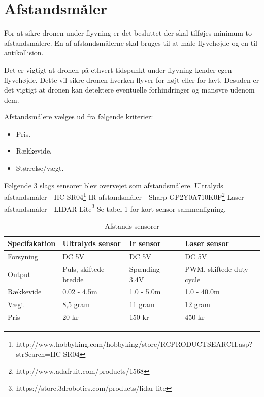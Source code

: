 \section{Afstandsmåler}

For at sikre dronen under flyvning er det besluttet der skal tilføjes minimum to afstandsmålere. En af afstandsmålerne skal bruges til at måle flyvehøjde og en til antikollision.

Det er vigtigt at dronen på ethvert tidspunkt under flyvning kender egen flyvehøjde. Dette vil sikre dronen hverken flyver for højt eller for lavt. Desuden er det vigtigt at dronen kan detektere eventuelle forhindringer og manøvre udenom dem.

Afstandsmålere vælges ud fra følgende kriterier:  
\begin{itemize}
	\item Pris.
	\item Rækkevide. 
	\item Størrelse/vægt. 
\end{itemize}

\vspace{0.5cm}

Følgende 3 slags sensorer blev overvejet som afstandsmålere. 
\newline Ultralyds afstandsmåler - HC-SR04\footnote{http://www.hobbyking.com/hobbyking/store/RC\textunderscore PRODUCT\textunderscore SEARCH.asp?strSearch=HC-SR04}  
\newline IR afstandsmåler - Sharp GP2Y0A710K0F\footnote{http://www.adafruit.com/products/1568}  \newline Laser afstandsmåler - LIDAR-Lite\footnote{https://store.3drobotics.com/products/lidar-lite}  \newline Se tabel \ref{tab:Afstands_sensorer} for kort sensor sammenligning.

\begin{table}[H]
	\centering
		\begin{tabular}{|p{2.8cm}|p{3.4 cm}|p{3.4 cm}|p{3.4 cm}|} 
		\hline
			\textbf{Specifakation} 	& \textbf{Ultralyds sensor} 	& \textbf{Ir sensor} 		& \textbf{Laser sensor} \\ \hline
			 Forsyning 				& DC 5V 						& DC 5V 					& DC 5V \\ \hline			 
			 Output 				& Puls, \newline skiftede bredde 		& Spænding \newline 1.4 - 3.4V 		& PWM, \newline skiftede duty cycle\\ \hline
			 Rækkevide 					& 0.02 - 4.5m 					& 1.0 - 5.0m 				& 1.0 - 40.0m \\ \hline
			 Vægt 					& 8,5 gram 						& 11 gram 					& 12 gram \\ \hline
		 	 Pris 					& 20 kr 						& 150 kr 					& 450 kr \\ \hline			 
		\end{tabular}
	\caption{Afstands sensorer}
	\label{tab:Afstands_sensorer}
\end{table}

